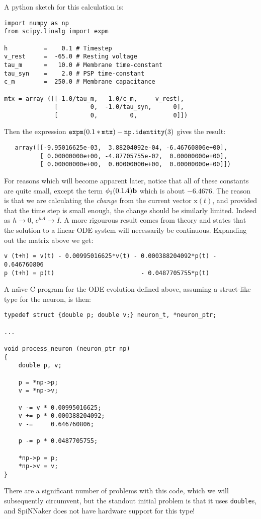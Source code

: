 A python sketch for this calculation is:
\begin{verbatim}
import numpy as np
from scipy.linalg import expm

h          =    0.1 # Timestep
v_rest     =  -65.0 # Resting voltage
tau_m      =   10.0 # Membrane time-constant
tau_syn    =    2.0 # PSP time-constant
c_m        =  250.0 # Membrane capacitance

mtx = array ([[-1.0/tau_m,   1.0/c_m,     v_rest],
              [         0,  -1.0/tau_syn,      0],
              [         0,         0,          0]])
\end{verbatim}
Then the expression $\mbox{\tt expm} (0.1 \ast \mbox{\tt mtx}) - \mbox{\tt np.identity}(3)$
gives the result:
\begin{verbatim}
   array([[-9.95016625e-03,  3.88204092e-04, -6.46760806e+00],
          [ 0.00000000e+00, -4.87705755e-02,  0.00000000e+00],
          [ 0.00000000e+00,  0.00000000e+00,  0.00000000e+00]])
\end{verbatim}
For reasons which will become apparent later, notice that all of these
constants are quite small, except the term
$\phi_1(0.1 A) \mbox{\bf b}$ which is about $-6.4676$. The reason is
that we are calculating the {\em change} from the current vector
$\mbox{x}(t)$, and provided that the time step is small enough, the
change should be similarly limited. Indeed as $h\to 0$, $e^{hA}\to
I$. A more rigourous result comes from theory and states that the
solution to a linear ODE system will necessarily be
continuous. Expanding out the matrix above we get:
\begin{verbatim}
v (t+h) = v(t) - 0.00995016625*v(t) - 0.000388204092*p(t) - 0.646760806
p (t+h) = p(t)                        - 0.0487705755*p(t)
\end{verbatim}

A na\"{\i}ve C program for the ODE evolution defined above, assuming a
struct-like type for the neuron, is then:
\begin{verbatim}
typedef struct {double p; double v;} neuron_t, *neuron_ptr;

...

void process_neuron (neuron_ptr np)
{
    double p, v;

    p = *np->p;
    v = *np->v;

    v -= v * 0.00995016625;
    v += p * 0.000388204092;
    v -=     0.646760806;

    p -= p * 0.0487705755;

    *np->p = p;
    *np->v = v;
}
\end{verbatim}
There are a significant number of problems with this code, which we
will subsequently circumvent, but the standout initial problem is that
it uses {\tt double}s, and SpiNNaker does not have hardware support
for this type!

